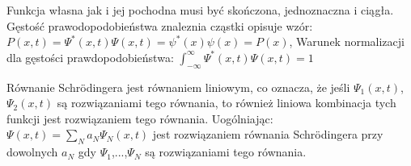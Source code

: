 Funkcja własna jak i jej pochodna musi być skończona, jednoznaczna i ciągła. Gęstość prawodopodobieństwa znaleznia cząstki opisuje wzór:\newline
$ P(x,t) = \Psi^*(x,t)\Psi(x,t) = \psi^*(x)\psi(x) = P(x) $, \newline
Warunek normalizacji dla gęstości prawdopodobieństwa:\newline
$ \int_{-\infty}^{\infty}\Psi^*(x,t)\Psi(x,t) = 1 $

Równanie Schrödingera jest równaniem liniowym, co oznacza, że jeśli $ \Psi_1(x,t) $, $ \Psi_2(x,t) $ są rozwiązaniami tego równania, to również liniowa kombinacja tych funkcji jest rozwiązaniem tego
równania. Uogólniając:\newline
$ \Psi(x,t) = \sum_N a_N\Psi_N(x,t) $ jest rozwiązaniem równania Schrödingera przy dowolnych $ a_N $ gdy $ \Psi_1 $,...,$ \Psi_N $ są rozwiązaniami
tego równania.
